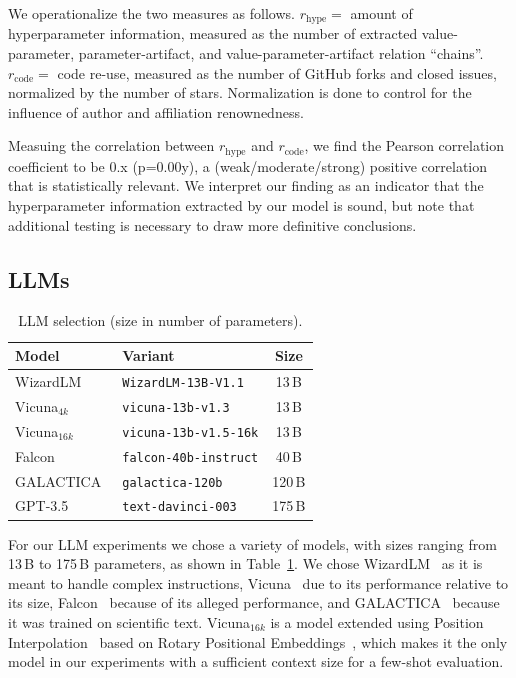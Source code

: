 We operationalize the two measures as follows. $r_\text{hype} =$ amount of hyperparameter information, measured as the number of extracted value-parameter, parameter-artifact, and value-parameter-artifact relation ``chains''. $r_\text{code} =$ code re-use, measured as the number of GitHub forks and closed issues, normalized by the number of stars. Normalization is done to control for the influence of author and affiliation renownedness.

Measuing the correlation between $r_\text{hype}$ and $r_\text{code}$, we find the Pearson correlation coefficient to be 0.x (p=0.00y), a (weak/moderate/strong) positive correlation that is statistically relevant. We interpret our finding as an indicator that the hyperparameter information extracted by our model is sound, but note that additional testing is necessary to draw more definitive conclusions.

\subsection{LLMs}

\begin{table}
\centering
  \caption[LLM selection]{LLM selection (size in number of parameters).}
  \label{tab:llmselection}
  \begin{tabular}{llc}
    \hline
    Model & Variant & Size \\
    \hline
    WizardLM~\cite{xu2023wizardlm2023}
    & \texttt{WizardLM-13B-V1.1} & 13\,B \\
    Vicuna${}_{4k}$~\cite{vicuna2023}
    & \texttt{vicuna-13b-v1.3} & 13\,B \\
    Vicuna${}_{16k}$~\cite{vicuna2023}
    & \texttt{vicuna-13b-v1.5-16k} & 13\,B \\
    Falcon~\cite{falcon40b-huggingface}
    & \texttt{falcon-40b-instruct} & 40\,B \\
    GALACTICA~\cite{GALACTICA2022}
    & \texttt{galactica-120b} & 120\,B \\
    GPT-3.5~\cite{Brown2020gpt3}
    & \texttt{text-davinci-003} & 175\,B \\
    \hline
    \end{tabular}
\end{table}

For our LLM experiments we chose a variety of models, with sizes ranging from 13\,B to 175\,B parameters, as shown in Table~\ref{tab:llmselection}.
We chose WizardLM~\cite{xu2023wizardlm2023} as it is meant to handle complex instructions, 
Vicuna~\cite{vicuna2023} due to its performance relative to its size, 
Falcon~\cite{falcon40b-huggingface} because of its alleged performance, 
and GALACTICA~\cite{GALACTICA2022} because it was trained on scientific text.
Vicuna${}_{16k}$ is a model extended using Position Interpolation~\cite{chen2023} based on Rotary Positional Embeddings~\cite{su2021}, which makes it the only model in our experiments with a sufficient context size for a few-shot evaluation.

